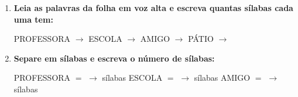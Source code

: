 \begin{exercicio}
\begin{enumerate}[resume]
  \item \textbf{Leia as palavras da folha em voz alta e escreva quantas sílabas cada uma tem:}

  \begin{center}
  PROFESSORA $\rightarrow$ \underline{\hspace{1cm}} \quad ESCOLA $\rightarrow$ \underline{\hspace{1cm}} \quad AMIGO $\rightarrow$ \underline{\hspace{1cm}} \quad PÁTIO $\rightarrow$ \underline{\hspace{1cm}}
  \end{center}

  \item \textbf{Separe em sílabas e escreva o número de sílabas:}
  \begin{center}
  PROFESSORA $=$ \underline{\hspace{1.2cm}} $\rightarrow$ \underline{\hspace{0.8cm}} sílabas \quad ESCOLA $=$ \underline{\hspace{1.2cm}} $\rightarrow$ \underline{\hspace{0.8cm}} sílabas \quad AMIGO $=$ \underline{\hspace{1.2cm}} $\rightarrow$ \underline{\hspace{0.8cm}} sílabas
  \end{center}

\end{enumerate}

\end{exercicio}




